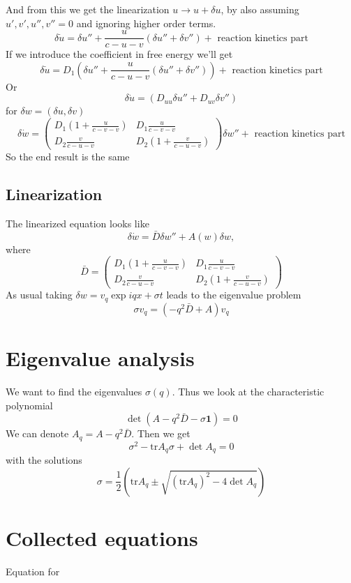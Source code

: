 \documentclass{article}
\begin{document}
And from this we get the linearization $u \to u+\delta u$, by also assuming  $u',v',u'',v'' = 0$
and ignoring higher order terms.
$$\delta \dot u = \delta u'' + \frac{u}{c-u-v}(\delta u'' + \delta v'') + \text{ reaction kinetics part}$$
If we introduce the coefficient in free energy we'll get
$$\delta \dot u = D_1\left(\delta u'' + \frac{u}{c-u-v}(\delta u'' + \delta v'')\right) + \text{ reaction kinetics part}$$
Or
$$\delta \dot u = \left(D_{uu}\delta u'' + D_{uv}\delta v'' \right)$$
for $\delta  w=(\delta u, \delta v)$
$$\delta \dot w = \begin{pmatrix} D_1(1+\frac{u}{c-v-v}) & D_1\frac{u}{c-v-v}\\ D_2\frac{v}{c-u-v} & D_2(1+\frac{v}{c-u-v})\end{pmatrix} \delta w'' + \text{ reaction kinetics part}$$
So the end result is the same
		
\subsection{Linearization}
The linearized equation looks like
\begin{equation}
\delta \dot w = \bar{D} \delta w'' + A(w) \delta w,
\end{equation}
where 
\begin{equation}
\bar{D} = \begin{pmatrix} D_1(1+\frac{u}{c-v-v}) & D_1\frac{u}{c-v-v}\\ D_2\frac{v}{c-u-v} & D_2(1+\frac{v}{c-u-v})\end{pmatrix} 
\end{equation}
As usual taking $\delta w = v_q \exp{iqx+\sigma t}$ leads to the eigenvalue problem
\begin{equation}
\sigma v_q = (-q^2 \bar{D}+A)v_q
\end{equation}

\section{Eigenvalue analysis}
We want to find the eigenvalues $\sigma(q)$. Thus we look at the characteristic polynomial
\begin{equation}
\det(A-q^2\bar{D}-\sigma\mathbf{1}) = 0
\end{equation}
We can denote $A_q = A-q^2 \bar{D}$.
Then we get
\begin{equation}
\sigma^2 - \text{tr}A_q \sigma + \det A_q = 0
\end{equation}
with the solutions
\begin{equation}
\sigma=\frac12\left(\text{tr}A_q \pm \sqrt{(\text{tr}A_q)^2-4\det A_q}\right)
\end{equation}

	\section{Collected equations}
	
	Equation for 
\end{document}
